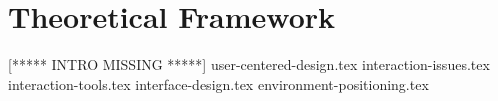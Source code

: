\chapter{Theoretical Framework}
[***** INTRO MISSING *****]
{user-centered-design.tex}
{interaction-issues.tex}
{interaction-tools.tex}
{interface-design.tex}
{environment-positioning.tex}
